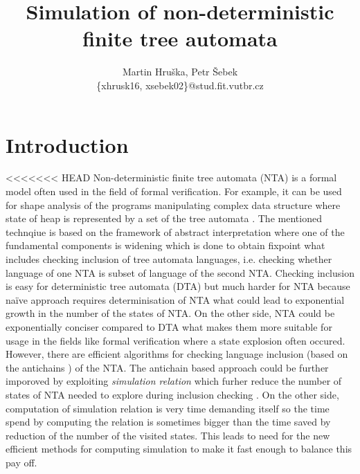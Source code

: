 \documentclass[a4paper, 12pt]{article}
\title{Simulation of non-deterministic finite tree automata}
\author{Martin Hruška, Petr Šebek\\\{xhrusk16, xsebek02\}@stud.fit.vutbr.cz}
\date{}
\begin{document}
\maketitle

\section{Introduction}
\label{sec:intro}

<<<<<<< HEAD
Non-deterministic finite tree automata (NTA) is a formal model often used in the field of formal verification.
For example, it can be used for shape analysis of the programs manipulating complex data structure where
state of heap is represented by a set of the tree automata \cite{methods12}.
The mentioned technqiue is based on the framework of abstract interpretation where one of the fundamental components
is widening which is done to obtain fixpoint what includes checking inclusion of tree automata languages, i.e.
checking whether language of one NTA is subset of language of the second NTA.
Checking inclusion is easy for deterministic tree automata (DTA) but much harder for NTA because
na{\"i}ve approach requires determinisation of NTA what could lead to exponential growth in the number of the states of NTA.
On the other side, NTA could be exponentially conciser compared to DTA what makes them more suitable for usage in the fields
like formal verification where a state explosion often occured.
However, there are efficient algorithms for checking language inclusion (based on the antichains \cite{tacas10}) of the NTA.
The antichain based approach could be further imporoved by exploiting \emph{simulation relation} which furher reduce
the number of states of NTA needed to explore during inclusion checking \cite{tacas10}.
On the other side, computation of simulation relation is very time demanding itself so the time spend by computing the relation
is sometimes bigger than the time saved by reduction of the number of the visited states.
This leads to need for the new efficient methods for computing simulation to make it fast enough to balance this pay off. 
\end{document}
